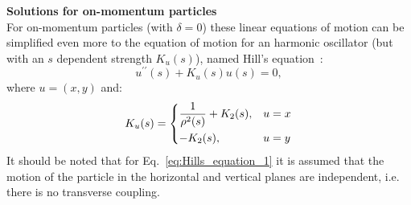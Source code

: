 \textbf{Solutions for on-momentum particles}\\
For on-momentum particles (with $\delta=0$) %
these linear equations of motion can be simplified even more to the equation of motion for an harmonic oscillator (but with an $s$ dependent strength $K_u(s)$), named Hill's equation~\cite{Lee:1425444}:
\begin{equation}\label{eq:Hills_equation_1}
    u^{\prime \prime}(s) + K_u(s) u(s) = 0,
\end{equation}
where $u=(x,y)$ and:
 \begin{equation}\label{eq:Hills_equation_2}
    K_u(s) = \begin{dcases}
        \frac{1}{\rho^2(s)}+K_2(s), & u=x \\
        -K_2(s), & u=y 
    \end{dcases}
\end{equation}
 It should be noted that for Eq.~\eqref{eq:Hills_equation_1} it is assumed that the motion of the particle in the horizontal and vertical planes are independent, i.e. there is no transverse coupling. %


